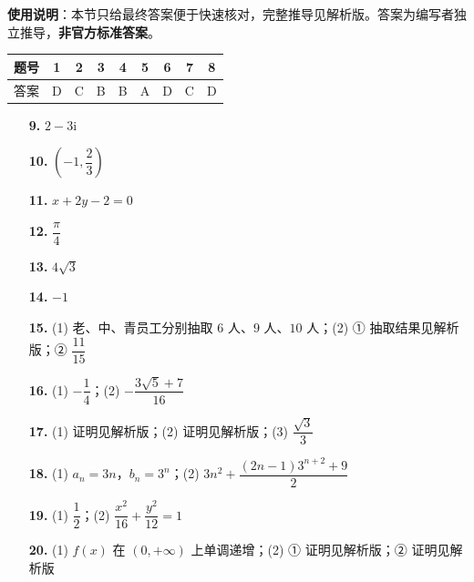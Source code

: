 
\begin{gknotice}
\textbf{使用说明}：本节只给最终答案便于快速核对，完整推导见解析版。答案为编写者独立推导，\textbf{非官方标准答案}。
\end{gknotice}

\begin{center}\begin{tabular}{ccccccccc}
\toprule
题号 & 1 & 2 & 3 & 4 & 5 & 6 & 7 & 8 \\
\midrule
答案 & D & C & B & B & A & D & C & D \\
\bottomrule
\end{tabular}\end{center}

\begin{itemize}[leftmargin=2.6em]
  \item[\textbf{9.}] $2 - 3\mathrm{i}$
  \item[\textbf{10.}] $\left(-1, \dfrac{2}{3}\right)$
  \item[\textbf{11.}] $x + 2y - 2 = 0$
  \item[\textbf{12.}] $\dfrac{\pi}{4}$
  \item[\textbf{13.}] $4\sqrt{3}$
  \item[\textbf{14.}] $-1$
\end{itemize}

\begin{itemize}[leftmargin=2.6em]
  \item[\textbf{15.}] (1) 老、中、青员工分别抽取 $6$ 人、$9$ 人、$10$ 人；(2) ① 抽取结果见解析版；② $\dfrac{11}{15}$
  \item[\textbf{16.}] (1) $-\dfrac{1}{4}$；(2) $-\dfrac{3\sqrt{5} + 7}{16}$
  \item[\textbf{17.}] (1) 证明见解析版；(2) 证明见解析版；(3) $\dfrac{\sqrt{3}}{3}$
  \item[\textbf{18.}] (1) $a_n = 3n$，$b_n = 3^n$；(2) $3n^2 + \dfrac{(2n - 1)3^{n+2} + 9}{2}$
  \item[\textbf{19.}] (1) $\dfrac{1}{2}$；(2) $\dfrac{x^2}{16} + \dfrac{y^2}{12} = 1$
  \item[\textbf{20.}] (1) $f(x)$ 在 $(0, +\infty)$ 上单调递增；(2) ① 证明见解析版；② 证明见解析版
\end{itemize}
